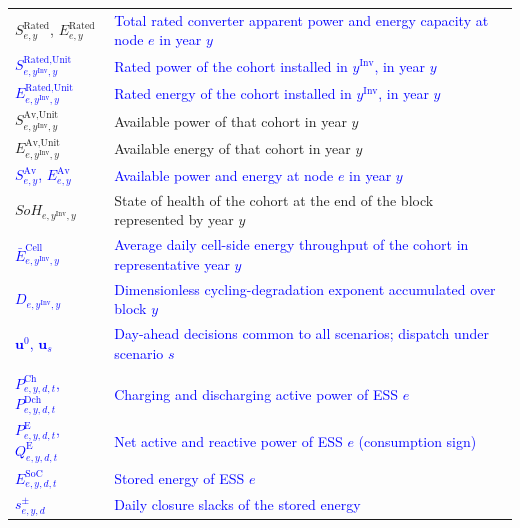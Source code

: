 \documentclass[preprint,12pt]{elsarticle}
\begin{document}
\begin{longtable}{@{}>{\raggedright\arraybackslash}p{} >{\raggedright\arraybackslash}p{}@{}}
        $S^{\text{Rated}}_{e,y}$, $E^{\text{Rated}}_{e,y}$ & \textcolor{blue}{Total rated converter apparent power and energy capacity at node $e$ in year $y$} \\
        \textcolor{blue}{$S^{\text{Rated,Unit}}_{e,y^\text{Inv},y}$} & \textcolor{blue}{Rated power of the cohort installed in $y^\text{Inv}$, in year $y$} \\
        \textcolor{blue}{$E^{\text{Rated,Unit}}_{e,y^\text{Inv},y}$} & \textcolor{blue}{Rated energy of the cohort installed in $y^\text{Inv}$, in year $y$} \\
        $S^{\text{Av,Unit}}_{e,y^\text{Inv},y}$ & Available power of that cohort in year $y$ \\
        $E^{\text{Av,Unit}}_{e,y^\text{Inv},y}$ & Available energy of that cohort in year $y$ \\
        \textcolor{blue}{$S^{\text{Av}}_{e,y}$, $E^{\text{Av}}_{e,y}$} & \textcolor{blue}{Available power and energy at node $e$ in year $y$} \\
        $SoH_{e,y^\text{Inv},y}$ & State of health of the cohort at the end of the block represented by year $y$ \\
        \textcolor{blue}{$\bar{E}^{\text{Cell}}_{e,y^\text{Inv},y}$} & \textcolor{blue}{Average daily cell-side energy throughput of the cohort in representative year $y$} \\
        \textcolor{blue}{$D_{e,y^\text{Inv},y}$} & \textcolor{blue}{Dimensionless cycling-degradation exponent accumulated over block $y$} \\        
        \textcolor{blue}{$\boldsymbol{u}^{0}$, $\boldsymbol{u}_s$} & \textcolor{blue}{Day-ahead decisions common to all scenarios; dispatch under scenario $s$} \\
        \midrule
        \multicolumn{2}{@{}l}{\textbf{Operation}}\\*
        \textcolor{blue}{$P^{\text{Ch}}_{e,y,d,t}$, $P^{\text{Dch}}_{e,y,d,t}$} & \textcolor{blue}{Charging and discharging active power of ESS $e$} \\
        \textcolor{blue}{$P^{\text{E}}_{e,y,d,t}$, $Q^{\text{E}}_{e,y,d,t}$} & \textcolor{blue}{Net active and reactive power of ESS $e$ (consumption sign)} \\
        \textcolor{blue}{$E^{\text{SoC}}_{e,y,d,t}$} & \textcolor{blue}{Stored energy of ESS $e$} \\
        \textcolor{blue}{$s^{\pm}_{e,y,d}$} & \textcolor{blue}{Daily closure slacks of the stored energy} \\

\end{longtable}
\end{document}
